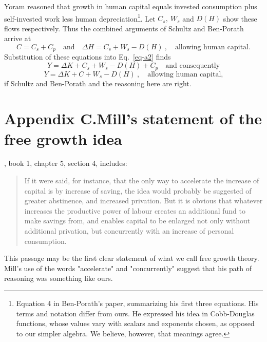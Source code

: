 \documentclass[a4padisinvitingper,fleqn]{latex_styles/cas-sc}
\begin{document}
Yoram \citet{ben-porathProductionHumanCapital1967} reasoned
that growth in human capital equals invested consumption plus
self-invested work less human depreciation\footnote{Equation 4 in
  Ben-Porath's paper, summarizing his first three equations. His terms and
  notation differ from ours. He expressed his idea in Cobb-Douglas functions, whose values vary with scalars and exponents chosen, as opposed to our simpler algebra. We believe, however, that meanings agree.}.
Let \(C_{s},\ W_{s}\) and \(D(H)\) show these flows respectively.
Thus the combined arguments of Schultz and Ben-Porath arrive at
%
\begin{equation}
C = C_{s} + C_{p} \quad \text{and}
\quad \Delta H = C_{s} + W_{s} - D(H)\ , \quad \text{allowing human capital.}\label{eq-a3}
\end{equation}
%
Substitution of these equations into Eq.~\eqref{eq-a2} finds
%
\[Y = \Delta K + C_{s} + W_{s} - D(H) + C_{p} \quad \text{and consequently}\]
%
\vspace{-5ex}
\begin{equation}
    Y = \Delta K + C + W_{s} - D(H)\ , \quad \text{allowing human capital,}\label{eq-a4}
\end{equation}
%
if Schultz and Ben-Porath and the reasoning here are right.

\renewcommand{\theequation}{C.\arabic{equation}}
\setcounter{equation}{0}

\hypertarget{appendix-c}{%
\section*{Appendix C.\hspace{0.5em}Mill's statement of the free growth idea}\label{appendix-c}}

\cite{millPrinciplesPoliticalEconomy1848}, book 1, chapter 5, section 4, includes:
\begin{quote}
If it were said, for instance, that the only way to accelerate the increase of capital is by increase of saving, the idea would probably be suggested of greater abstinence, and increased privation. But it is obvious that whatever increases the productive power of labour creates an additional fund to make savings from, and enables capital to be enlarged not only without additional privation, but concurrently with an increase of personal consumption. 
\end{quote}

This passage may be the first clear statement of what we call free growth theory. Mill's use of the words "accelerate" and "concurrently" suggest that his path of reasoning was something like ours.
\end{document}
